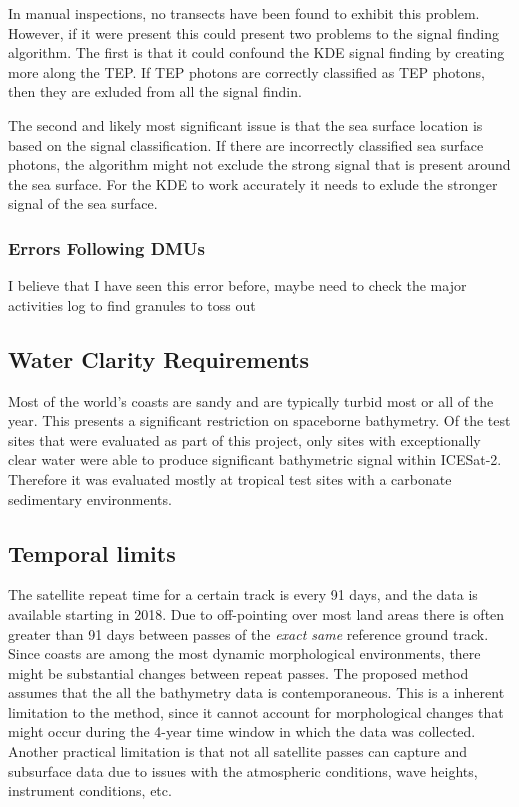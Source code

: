 In manual inspections, no transects have been found to exhibit this problem. However, if it were present this could present two problems to the signal finding algorithm. The first is that it could confound the KDE signal finding by creating more along the TEP. If TEP photons are correctly classified as TEP photons, then they are exluded from all the signal findin. 

The second and likely most significant issue is that the sea surface location is based on the signal classification. If there are incorrectly classified sea surface photons, the algorithm might not exclude the strong signal that is present around the sea surface. For the KDE to work accurately it needs to exlude the stronger signal of the sea surface. 

\subsubsection{Errors Following DMUs}

I believe that I have seen this error before, maybe need to check the major activities log to find granules to toss out


\subsection{Water Clarity Requirements}

Most of the world's coasts are sandy and are typically turbid most or all of the year. This presents a significant restriction on spaceborne bathymetry. Of the test sites that were evaluated as part of this project, only sites with exceptionally clear water were able to produce significant bathymetric signal within ICESat-2. Therefore it was evaluated mostly at tropical test sites with a carbonate sedimentary environments.  

\subsection{Temporal limits}

The satellite repeat time for a certain track is every 91 days, and the data is available starting in 2018. Due to off-pointing over most land areas there is often greater than 91 days between passes of the \emph{exact same} reference ground track. Since coasts are among the most dynamic morphological environments, there might be substantial changes between repeat passes. The proposed method assumes that the all the bathymetry data is contemporaneous. This is a inherent limitation to the method, since it cannot account for morphological changes that might occur during the 4-year time window in which the data was collected. Another practical limitation is that not all satellite passes can capture and subsurface data due to issues with the atmospheric conditions, wave heights, instrument conditions, etc. 

